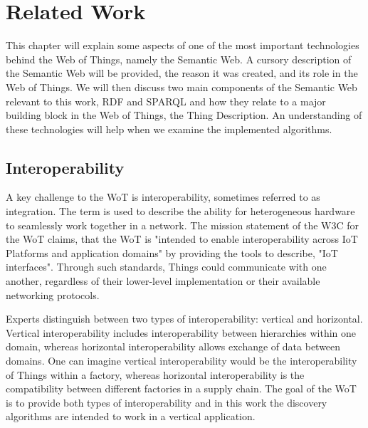 \chapter{Related Work}



This chapter will explain some aspects of one of the most important technologies behind the Web of Things, namely the Semantic Web. A cursory description of the Semantic Web will be provided, the reason it was created, and its role in the Web of Things. We will then discuss two main components of the Semantic Web relevant to this work, RDF and SPARQL and how they relate to a major building block in the Web of Things, the Thing Description. An understanding of these technologies will help when we examine the implemented algorithms.

\section{Interoperability}
A key challenge to the WoT is interoperability, sometimes referred to as integration. The term is used to describe the ability for heterogeneous hardware to seamlessly work together in a network. The mission statement of the W3C for the WoT claims, that the WoT is "intended to enable interoperability across IoT Platforms and application domains" by providing the tools to describe, "IoT interfaces". Through such standards, Things could communicate with one another, regardless of their lower-level implementation or their available networking protocols. \cite{Kazuo.2017}

Experts distinguish between two types of interoperability: vertical and horizontal. Vertical interoperability includes interoperability between hierarchies within one domain, whereas horizontal interoperability allows exchange of data between domains. One can imagine vertical interoperability would be the interoperability of Things within a factory, whereas horizontal interoperability is the compatibility between different factories in a supply chain\cite{wang2016implementing}. The goal of the WoT is to provide both types of interoperability and in this work the discovery algorithms are intended to work in a vertical application.

